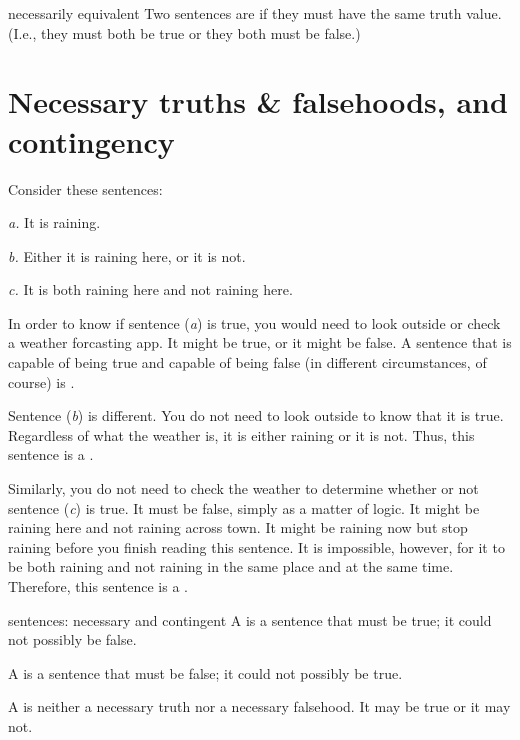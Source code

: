 \begin{factboxy}{necessarily equivalent}
Two sentences are  if they must have the same truth value. (I.e., they must both be true or they both must be false.)
\end{factboxy}


\section[Necessary truths, falsehoods, and contingency]{Necessary truths \& falsehoods, and contingency}\label{s:nec-truth}

Consider these sentences:
	\begin{earg}
		\item[\textit{a.}] It is raining.
		\item[\textit{b.}] Either it is raining here, or it is not.
		\item[\textit{c.}] It is both raining here and not raining here.
	\end{earg}
In order to know if sentence (\textit{a}) is true, you would need to look outside or check a weather forcasting app. It might be true, or it might be false. A sentence that is capable of being true and capable of being false (in different circumstances, of course) is .

Sentence (\textit{b}) is different. You do not need to look outside to know that it is true. Regardless of what the weather is, it is either raining or it is not. Thus, this sentence is a . 

Similarly, you do not need to check the weather to determine whether or not sentence (\textit{c}) is true. It must be false, simply as a matter of logic. It might be raining here and not raining across town. It might be raining now but stop raining before you finish reading this sentence. It is impossible, however, for it to be both raining and not raining in the same place and at the same time. Therefore, this sentence is a .

\begin{factboxy}{sentences: necessary and contingent}
\noindent A  is a sentence that must be true; it could not possibly be false.

\noindent A  is a sentence that must be false; it could not possibly be true.

\noindent A  is neither a necessary truth nor a necessary falsehood. It may be true or it may not.
\end{factboxy}

